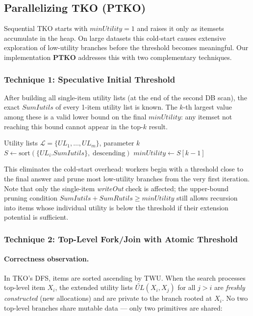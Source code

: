 \subsection{Parallelizing TKO (PTKO)}
\label{sec:ptko}

Sequential TKO starts with $minUtility = 1$ and raises it only as itemsets accumulate in the heap.
On large datasets this cold-start causes extensive exploration of low-utility branches before the
threshold becomes meaningful.
Our implementation \textbf{PTKO} addresses this with two complementary techniques.

\subsubsection{Technique 1: Speculative Initial Threshold}

After building all single-item utility lists (at the end of the second DB scan), the exact
$SumIutils$ of every 1-item utility list is known.
The $k$-th largest value among these is a valid lower bound on the final $minUtility$:
any itemset not reaching this bound cannot appear in the top-$k$ result.

\begin{algorithm}[H]
\caption{Speculative Threshold Bootstrap}
\begin{algorithmic}[1]
\Require Utility lists $\mathcal{L} = \{UL_1, \ldots, UL_m\}$, parameter $k$
\State $S \leftarrow \text{sort}(\{UL_i.SumIutils\},\;\text{descending})$
    \State $minUtility \leftarrow S[k-1]$ 
\EndIf
\end{algorithmic}
\end{algorithm}

This eliminates the cold-start overhead: workers begin with a threshold close to the final
answer and prune most low-utility branches from the very first iteration.
Note that only the single-item \emph{writeOut} check is affected; the upper-bound pruning
condition $SumIutils + SumRutils \geq minUtility$ still allows recursion into items whose
individual utility is below the threshold if their extension potential is sufficient.

\subsubsection{Technique 2: Top-Level Fork/Join with Atomic Threshold}

\paragraph{Correctness observation.}
In TKO's DFS, items are sorted ascending by TWU.
When the search processes top-level item $X_i$, the extended utility lists
$\widetilde{UL}(X_i, X_j)$ for all $j > i$ are \emph{freshly constructed} (new allocations)
and are private to the branch rooted at $X_i$.
No two top-level branches share mutable data --- only two primitives are shared:

